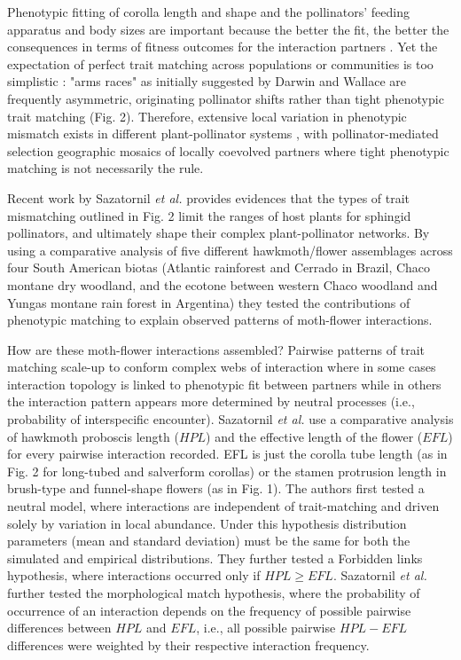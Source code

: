 \documentclass[a4paper,12pt]{article}
\begin{document}
 Phenotypic fitting of corolla length and shape and the pollinators' feeding apparatus and body sizes are important because the better the fit, the better the consequences in terms of fitness outcomes for the interaction partners \citep{Nilsson:1988}. Yet the expectation of perfect trait matching across populations or communities is too simplistic \citep{Anderson:2010}: "arms races" as initially suggested by Darwin and Wallace are frequently asymmetric, originating pollinator shifts rather than tight phenotypic trait matching (Fig. 2)\citep{Wasserthal:2014}. Therefore, extensive local variation in phenotypic mismatch exists in different plant-pollinator systems \citep[e.g., ][]{Cocucci:2009,Anderson:2010,More:2012}, with pollinator-mediated selection geographic mosaics of locally coevolved partners where tight phenotypic matching is not necessarily the rule.

Recent work by Sazatornil \textit{et al.} \citep{Sazatornil:2016} provides evidences that the types of trait mismatching outlined in Fig. 2 limit the ranges of host plants for sphingid pollinators, and ultimately shape their complex plant-pollinator networks. By using a comparative analysis of five different hawkmoth/flower assemblages across four South American biotas (Atlantic rainforest and Cerrado in Brazil, Chaco montane dry woodland, and the ecotone between western Chaco woodland and Yungas montane rain forest in Argentina) they tested the contributions of phenotypic matching to explain observed patterns of moth-flower interactions.

How are these moth-flower interactions assembled?  Pairwise patterns of trait matching scale-up to conform complex webs of interaction where in some cases interaction topology is linked to phenotypic fit between partners while in others the interaction pattern appears more determined by neutral processes (i.e., probability of interspecific encounter). Sazatornil \textit{et al.} \citep{Sazatornil:2016} use a comparative analysis of hawkmoth proboscis length ($HPL$) and the effective length of the flower ($EFL$) for every pairwise interaction recorded. EFL is just the corolla tube length (as in Fig. 2 for long-tubed and salverform corollas) or the stamen protrusion length in brush-type and funnel-shape flowers (as in Fig. 1). The authors first tested a neutral model, where interactions are independent of trait-matching and driven solely by variation in local abundance. Under this hypothesis distribution parameters (mean and standard deviation) must be the same for both the simulated and empirical distributions. They further tested a Forbidden links hypothesis, where interactions occurred only if $HPL \geq EFL$. Sazatornil \textit{et al.} further tested the morphological match hypothesis, where the probability of occurrence of an interaction depends on the frequency of possible pairwise differences between $HPL$ and $EFL$, i.e., all possible pairwise $HPL-EFL$ differences were weighted by their respective interaction frequency.
\end{document}
